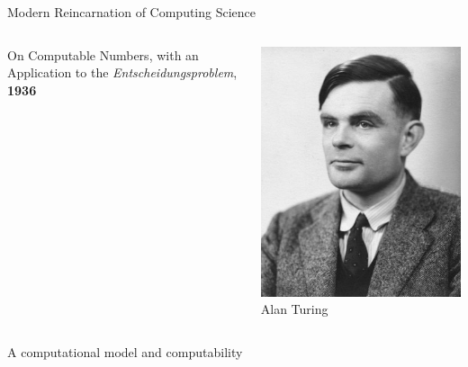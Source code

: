 \documentclass{beamer}
\begin{document}
\begin{frame}{Modern Reincarnation of Computing Science}

  \begin{minipage}[0.3\textheight]{\textwidth}
  \begin{columns}[c]
  \begin{column}{0.7\textwidth}
          On Computable Numbers, with an Application to the 
          \emph{Entscheidungsproblem}, \textbf{1936}
  \end{column}
  \begin{column}{0.3\textwidth}
    \includegraphics[scale=2]{images/turing.jpg}
    \tiny{Alan Turing}
  \end{column}
  \end{columns}
  \end{minipage}


  \vfill
  \begin{center}
  \scriptsize{
        A computational model and  computability
  }
  \end{center}
\end{frame}
\end{document}
